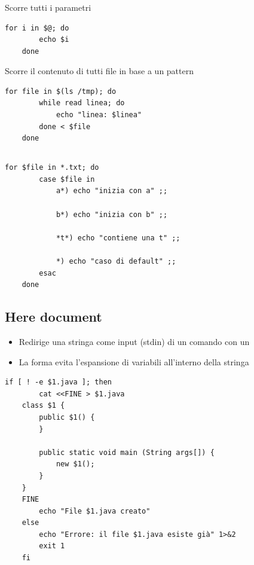 \documentclass[../main.tex]{subfiles}
\begin{document}
\vspace{0.5cm}
\subsubsection{}
Scorre tutti i parametri
\begin{lstlisting}[style=bash]
    for i in $@; do
        echo $i
    done
\end{lstlisting}

\vspace{0.25cm}
Scorre il contenuto di tutti file in base a un pattern
\begin{lstlisting}[style=bash]
    for file in $(ls /tmp); do
        while read linea; do
            echo "linea: $linea"
        done < $file
    done
\end{lstlisting}

\pagebreak
\subsection{}
\begin{lstlisting}[style=bash]
    for $file in *.txt; do
        case $file in
            a*) echo "inizia con a" ;;

            b*) echo "inizia con b" ;;

            *t*) echo "contiene una t" ;;

            *) echo "caso di default" ;;
        esac
    done
\end{lstlisting}

\vspace{0.5cm}
\subsection{Here document}
\begin{itemize}
    \item Redirige una stringa come input (stdin) di un comando con un 
    \item La forma  evita l'espansione di variabili all'interno della stringa
\end{itemize}
\begin{lstlisting}[style=bash]
    if [ ! -e $1.java ]; then
        cat <<FINE > $1.java
    class $1 {
        public $1() {
        }

        public static void main (String args[]) {
            new $1();
        }
    }
    FINE
        echo "File $1.java creato"
    else
        echo "Errore: il file $1.java esiste già" 1>&2
        exit 1
    fi
\end{lstlisting}
\end{document}
